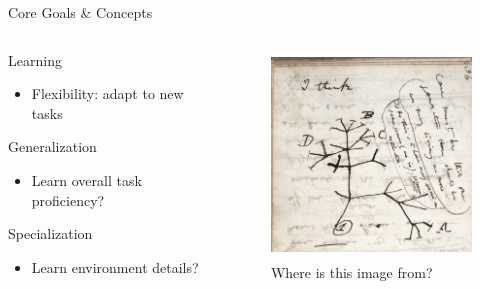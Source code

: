 \documentclass[aspectratio=169]{beamer}
\makeatletter
\renewcommand{\emph}[1]{{\Huge \color{pureminimalistic@text@red} #1}}
\renewcommand{\white}[1]{{\color{pureminimalistic@text@white} #1}}
\makeatother
\begin{document}
\begin{frame}{\white{Core Goals \& Concepts}}
  \begin{columns}[T]
      \begin{column}{.5\linewidth}
            \vspace{-0.7em}
            \item \emph{Learning}
              \begin{itemize}
                \item {\Medium Flexibility: adapt to new tasks}
              \end{itemize}
            \vspace{1em}
            \item \emph{Generalization}
              \begin{itemize}
                \item {\Medium Learn overall task proficiency?}
              \end{itemize}
            \vspace{1em}
            \item \emph{Specialization}
              \begin{itemize}
                \item {\Medium Learn environment details?}
              \end{itemize}
      \end{column}
      \begin{column}{.5\linewidth}
          \begin{figure}
              \centering
              \includegraphics[height=5.5cm, keepaspectratio]{figures/i_think.png}
              \caption{Where is this image from?}
              \label{fig:i_think}
          \end{figure}
      \end{column}
  \end{columns}
\end{frame}
\end{document}
